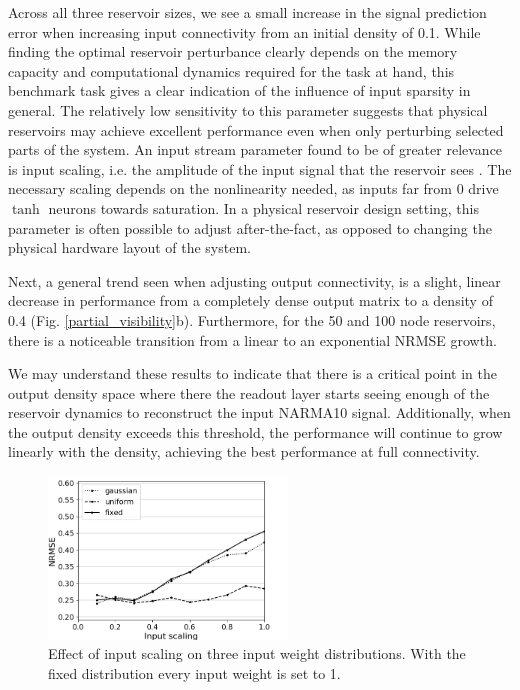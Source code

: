 Across all three reservoir sizes, we see a small increase in the signal
prediction error when increasing input connectivity from an initial density of
0.1. While finding the optimal reservoir perturbance clearly depends on the
memory capacity and computational dynamics required for the task at hand, this
benchmark task gives a clear indication of the influence of input sparsity in
general. The relatively low sensitivity to this parameter suggests that physical
reservoirs may achieve excellent performance even when only perturbing selected
parts of the system. An input stream parameter found to be of greater relevance
is input scaling, i.e. the amplitude of the input signal that the reservoir sees
\cite{alippi_quantification_2009}. The necessary scaling depends on the
nonlinearity needed, as inputs far from 0 drive $\tanh$ neurons towards
saturation. In a physical reservoir design setting, this parameter is often
possible to adjust after-the-fact, as opposed to changing the physical hardware
layout of the system.

Next, a general trend seen when adjusting output connectivity, is a slight,
linear decrease in performance from a completely dense output matrix to a
density of 0.4 (Fig. \ref{partial_visibility}b). Furthermore, for the 50 and 100
node reservoirs, there is a noticeable transition from a linear to an
exponential NRMSE growth.

We may understand these results to indicate that there is a critical point in
the output density space where there the readout layer starts seeing enough of
the reservoir dynamics to reconstruct the input NARMA10 signal. Additionally,
when the output density exceeds this threshold, the performance will continue to
grow linearly with the density, achieving the best performance at full
connectivity.


\begin{figure}[H]
  \centering
  \includegraphics[width=2.5in]{img/input_scaling_distrib.png}
  \caption{
    Effect of input scaling on three input weight distributions. With the fixed
distribution every input weight is set to 1.
  }
  \label{input_scaling_distrib}
\end{figure}

